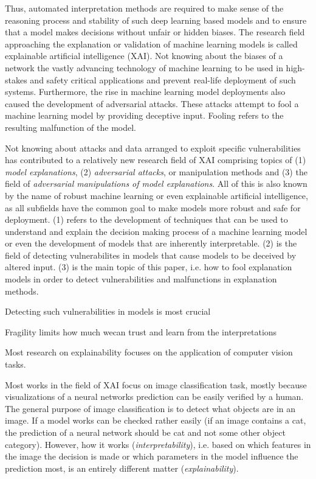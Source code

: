Thus, automated interpretation methods are required to make sense of the reasoning process and stability of such deep learning based models and to ensure that a model makes decisions without unfair or hidden biases. 
The research field approaching the explanation or validation of machine learning models is called explainable artificial intelligence (XAI).
Not knowing about the biases of a network the vastly advancing technology of machine learning to be used in high-stakes and safety critical applications and prevent real-life deployment of such systems. 
Furthermore, the rise in machine learning model deployments also caused the development of adversarial attacks. These attacks attempt to fool a machine learning model by providing deceptive input. Fooling refers to the resulting malfunction of the model. 

Not knowing about attacks and data arranged to exploit specific vulnerabilities has contributed to a relatively new research field of XAI comprising topics of (1) \textit{model explanations}, (2) \textit{adversarial attacks}, or manipulation methods and (3) the field of \textit{adversarial manipulations of model explanations}. All of this is also known by the name of robust machine learning or even explainable artificial intelligence, as all subfields have the common goal to make models more robust and safe for deployment. 
(1) refers to the development of techniques that can be used to understand and explain the decision making process of a machine learning model or even the development of models that are inherently interpretable. (2) is the field of detecting vulnerabilites in models that cause models to be deceived by altered input. 
(3) is the main topic of this paper, i.e. how to fool explanation models in order to detect vulnerabilities and malfunctions in explanation methods. 

Detecting such vulnerabilities in models is most crucial 

Fragility limits how much wecan trust and learn from the interpretations



Most research on explainability focuses on the application of computer vision tasks. 

Most works in the field of XAI focus on image classification task, mostly because visualizations of a neural networks prediction can be easily verified by a human. The general purpose of image classification is to detect what objects are in an image. If a model works can be checked rather easily (if an image contains a cat, the prediction of a neural network should be cat and not some other object category). However, how it works (\textit{interpretability}), i.e. based on which features in the image the decision is made or which parameters in the model influence the prediction most, is an entirely different matter (\textit{explainability}).  


